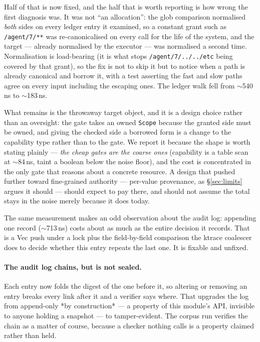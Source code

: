 \documentclass[11pt]{article}
\newcommand{\code}[1]{\texttt{#1}}
\begin{document}
Half of that is now fixed, and the half that is worth reporting is how wrong the
first diagnosis was. It was not ``an allocation'': the glob comparison
normalised \emph{both} sides on every ledger entry it examined, so a constant
grant such as \code{/agent/7/**} was re-canonicalised on every call for the life
of the system, and the target --- already normalised by the executor --- was
normalised a second time. Normalisation is load-bearing (it is what stops
\code{/agent/7/../../etc} being covered by that grant), so the fix is not to
skip it but to notice when a path is already canonical and borrow it, with a
test asserting the fast and slow paths agree on every input including the
escaping ones. The ledger walk fell from $\sim$540\,ns to $\sim$183\,ns.

What remains is the throwaway target object, and it is a design choice rather
than an oversight: the gate takes an owned \code{Scope} because the granted side
must be owned, and giving the checked side a borrowed form is a change to the
capability type rather than to the gate. We report it because the shape is worth
stating plainly --- \emph{the cheap gates are the coarse ones} (capability is a
table scan at $\sim$84\,ns, taint a boolean below the noise floor), and the cost
is concentrated in the only gate that reasons about a concrete resource. A design
that pushed further toward fine-grained authority --- per-value provenance, as
\S\ref{sec:limits} argues it should --- should expect to pay there, and should
not assume the total stays in the noise merely because it does today.

The same measurement makes an odd observation about the audit log: appending one
record ($\sim$713\,ns) costs about as much as the entire decision it records.
That is a Vec push under a lock plus the field-by-field comparison the ktrace
coalescer does to decide whether this entry repeats the last one. It is fixable
and unfixed.

\paragraph{The audit log chains, but is not sealed.} Each entry now folds the
digest of the one before it, so altering or removing an entry breaks every link
after it and a verifier says where. That upgrades the log from append-only *by
construction* --- a property of this module's API, invisible to anyone holding a
snapshot --- to tamper-evident. The corpus run verifies the chain as a matter of
course, because a checker nothing calls is a property claimed rather than held.
\end{document}
